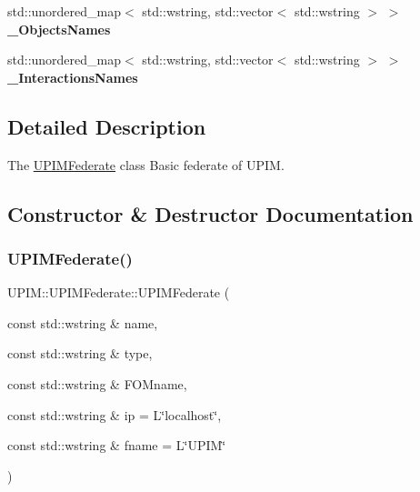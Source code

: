 \begin{DoxyCompactItemize}
\mbox{\label{classUPIM_1_1UPIMFederate_a2a031e76ace7585d89044aa0d9cfe41e}} 
std\+::unordered\+\_\+map$<$ std\+::wstring, std\+::vector$<$ std\+::wstring $>$ $>$ {\bfseries \+\_\+\+Objects\+Names}
\item 
\mbox{\label{classUPIM_1_1UPIMFederate_a1552c4b1bbb1fa99011ef6fbc45d725a}} 
std\+::unordered\+\_\+map$<$ std\+::wstring, std\+::vector$<$ std\+::wstring $>$ $>$ {\bfseries \+\_\+\+Interactions\+Names}
\end{DoxyCompactItemize}


\subsection{Detailed Description}
The \hyperlink{classUPIM_1_1UPIMFederate}{U\+P\+I\+M\+Federate} class Basic federate of U\+P\+IM. 

\subsection{Constructor \& Destructor Documentation}
\mbox{\label{classUPIM_1_1UPIMFederate_a07d3d21558b527bb708f833fd28c1146}} 
\subsubsection{\texorpdfstring{U\+P\+I\+M\+Federate()}{UPIMFederate()}\hspace{0.1cm}{\footnotesize\ttfamily [1/2]}}
{\footnotesize\ttfamily U\+P\+I\+M\+::\+U\+P\+I\+M\+Federate\+::\+U\+P\+I\+M\+Federate (\begin{DoxyParamCaption}\item[{const std\+::wstring \&}]{name,  }\item[{const std\+::wstring \&}]{type,  }\item[{const std\+::wstring \&}]{F\+O\+Mname,  }\item[{const std\+::wstring \&}]{ip = {\ttfamily L\char`\"{}localhost\char`\"{}},  }\item[{const std\+::wstring \&}]{fname = {\ttfamily L\char`\"{}UPIM\char`\"{}} }\end{DoxyParamCaption})\hspace{0.3cm}{\ttfamily [noexcept]}}



